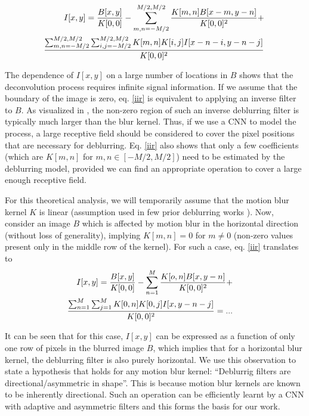 \documentclass[10pt,twocolumn,letterpaper]{article}
\begin{document}
\begin{small}
    \begin{equation} 
\hspace{-0.15cm}
\begin{aligned}
I[x,y] =\frac{B[x,y]}{K[0,0]}-\sum_{m,n=-M/2}^{M/2,M/2}\frac{K[m,n]B[x-m,y-n]}{K[0,0]^2}+ \\\frac{\sum_{m,n=-M/2}^{M/2,M/2}\sum_{i,j=-M/2}^{M/2,M/2}K[m,n]K[i,j]I[x-n-i,y-n-j]}{K[0,0]^2}
\end{aligned}
\label{iir}
\end{equation} 
\end{small}

The dependence of $I[x,y]$ on a large number of locations in $B$ shows that the deconvolution process requires infinite signal information. If we assume that the boundary of the image is zero, eq. \ref{iir} is equivalent to applying an inverse filter to $B$. As visualized in \cite{zhang2018dynamic}, the non-zero region of such an inverse deblurring filter is typically much larger than the blur kernel. Thus, if we use a CNN to model the process, a large receptive field should be considered to cover the pixel positions that are necessary for deblurring. Eq. \ref{iir} also shows that only a few coefficients (which are $K[m,n]$ for $m,n \in [-M/2,M/2]$) need to be estimated by the deblurring model, provided we can find an appropriate operation to cover a large enough receptive field. 


For this theoretical analysis, we will temporarily assume that the motion blur kernel $K$ is linear (assumption used in few prior deblurring works \cite{sun2015learning,gong2017motion}). Now, consider an  image $B$ which is affected by motion blur in the horizontal direction (without loss of generality), implying $K[m,n]=0$ for $m \neq 0$ (non-zero values present only in the middle row of the kernel). For such a case, eq. \ref{iir} translates to
\begin{equation} 
\hspace{-0.5cm}
\begin{aligned}
I[x,y] =\frac{B[x,y]}{K[0,0]}-\sum_{n=1}^{M}\frac{K[o,n]B[x,y-n]}{K[0,0]^2}+ \\\frac{\sum_{n=1}^{M}\sum_{j=1}^{M}K[0,n]K[0,j]I[x,y-n-j]}{K[0,0]^2}=...
\end{aligned}
\label{iir2}
\end{equation} 

It can be seen that for this case, $I[x,y]$ can be expressed as a function of only one row of pixels in the blurred image $B$, which implies that for a horizontal blur kernel, the deblurring filter is also purely horizontal. We use this observation to state a hypothesis that holds for any motion blur kernel: ``Deblurrig filters are directional/asymmetric in shape''. This is because motion blur kernels are known to be inherently directional. Such an operation can be efficiently learnt by a CNN with adaptive and asymmetric filters and this forms the basis for our work.
\end{document}
